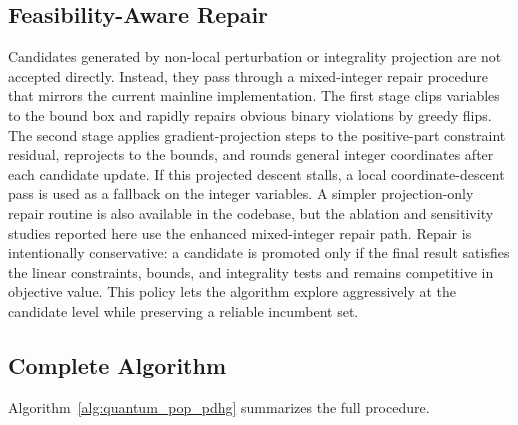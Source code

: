\subsection{Feasibility-Aware Repair}
\label{subsec:repair}

Candidates generated by non-local perturbation or integrality projection are not accepted directly. Instead, they pass through a mixed-integer repair procedure that mirrors the current mainline implementation. The first stage clips variables to the bound box and rapidly repairs obvious binary violations by greedy flips. The second stage applies gradient-projection steps to the positive-part constraint residual, reprojects to the bounds, and rounds general integer coordinates after each candidate update. If this projected descent stalls, a local coordinate-descent pass is used as a fallback on the integer variables. A simpler projection-only repair routine is also available in the codebase, but the ablation and sensitivity studies reported here use the enhanced mixed-integer repair path. Repair is intentionally conservative: a candidate is promoted only if the final result satisfies the linear constraints, bounds, and integrality tests and remains competitive in objective value. This policy lets the algorithm explore aggressively at the candidate level while preserving a reliable incumbent set.

\subsection{Complete Algorithm}
\label{subsec:algorithm}

Algorithm~\ref{alg:quantum_pop_pdhg} summarizes the full procedure.

